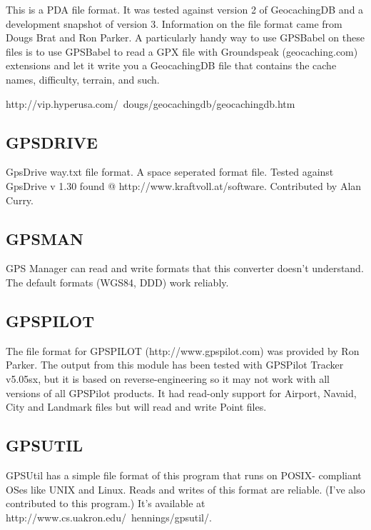 \documentclass[12pt]{article}
\begin{document}
	This is a PDA file format.    It was tested against version 2
	of GeocachingDB and a development snapshot of version 3.  
	Information on the file format came from Dougs Brat and Ron Parker.
	A particularly handy way to use GPSBabel on these files is to use
	GPSBabel to read a GPX file with Groundspeak  (geocaching.com) 
	extensions and let it write you a GeocachingDB file that contains
	the cache names, difficulty, terrain, and such.

	http://vip.hyperusa.com/~dougs/geocachingdb/geocachingdb.htm



\subsection{GPSDRIVE}
  
        GpsDrive way.txt file format. A space seperated format file. Tested
        against GpsDrive v 1.30 found @ http://www.kraftvoll.at/software.
        Contributed by Alan Curry.



\subsection{GPSMAN}

	GPS Manager can read and write formats that this converter doesn't
	understand.  The default formats (WGS84, DDD) work reliably.



\subsection{GPSPILOT}

	The file format for GPSPILOT (http://www.gpspilot.com) was provided
	by Ron Parker.  The output from this module has been tested with 
        GPSPilot Tracker v5.05sx, but it is based on reverse-engineering
        so it may not work with all versions of all GPSPilot products.
	It had read-only support for Airport, Navaid, City and Landmark 
	files but will read and write Point files.



\subsection{GPSUTIL}

	GPSUtil has a simple file format of this program that runs on POSIX-
	compliant OSes like UNIX and Linux.   Reads and writes of this format
	are reliable.   (I've also contributed to this program.)  It's 	
	available at http://www.cs.uakron.edu/~hennings/gpsutil/.
\end{document}
